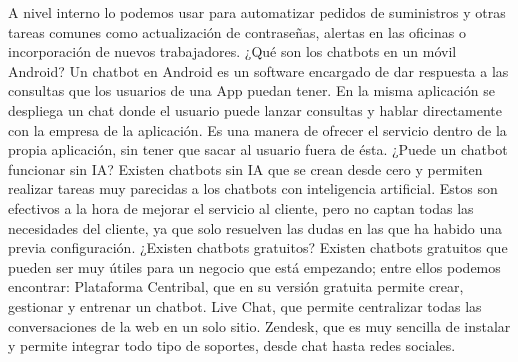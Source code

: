 A nivel interno lo podemos usar para automatizar pedidos de suministros y otras tareas comunes como actualización de contraseñas, alertas en las oficinas o incorporación de nuevos trabajadores.
¿Qué son los chatbots en un móvil Android?
Un chatbot en Android es un software encargado de dar respuesta a las consultas que los usuarios de una App puedan tener. En la misma aplicación se despliega un chat donde el usuario puede lanzar consultas y hablar directamente con la empresa de la aplicación. Es una manera de ofrecer el servicio dentro de la propia aplicación, sin tener que sacar al usuario fuera de ésta.
¿Puede un chatbot funcionar sin IA?
Existen chatbots sin IA que se crean desde cero y permiten realizar tareas muy parecidas a los chatbots con inteligencia artificial. Estos son efectivos a la hora de mejorar el servicio al cliente, pero no captan todas las necesidades del cliente, ya que solo resuelven las dudas en las que ha habido una previa configuración.
¿Existen chatbots gratuitos?
Existen chatbots gratuitos que pueden ser muy útiles para un negocio que está empezando; entre ellos podemos encontrar:
Plataforma Centribal, que en su versión gratuita permite crear, gestionar y entrenar un chatbot.
Live Chat, que permite centralizar todas las conversaciones de la web en un solo sitio.
Zendesk, que es muy sencilla de instalar y permite integrar todo tipo de soportes, desde chat hasta redes sociales.

